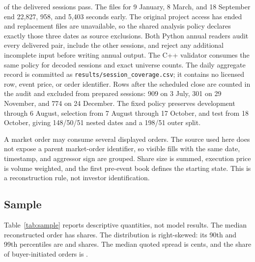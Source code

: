 \documentclass[11pt,a4paper]{article}
\begin{document}
\Sessions{} of the \DeliveredSessions{} delivered sessions pass. The files for
9 January, 8 March, and 18 September end 22,827, 958, and 5,403 seconds early.
The original project access has ended and replacement files are unavailable,
so the shared analysis policy declares exactly those three dates as source
exclusions. Both Python annual readers audit every delivered pair, include the
other \Sessions{} sessions, and reject any additional incomplete input before
writing annual output. The C++ validator consumes the same policy for decoded
sessions and exact universe counts. The daily aggregate record is committed as
\texttt{results/session\_coverage.csv}; it contains no licensed row, event
price, or order identifier. Rows after the scheduled close are counted in the
audit and excluded from prepared sessions: 909 on 3 July, 301 on 29 November,
and 774 on 24 December. The fixed policy preserves development through
6 August, selection from 7 August through 17 October, and test from 18 October,
giving 148/50/51 nested dates and a 198/51 outer split.

A market order may consume several displayed orders. The source used here does
not expose a parent market-order identifier, so visible fills with the same
date, timestamp, and aggressor sign are grouped. Share size is summed, execution
price is volume weighted, and the first pre-event book defines the starting
state. This is a reconstruction rule, not investor identification.

\subsection{Sample}

Table~\ref{tab:sample} reports descriptive quantities, not model results. The
median reconstructed order has \MedianOrderSize{} shares. The distribution is
right-skewed: its 90th and 99th percentiles are \PninetyOrderSize{} and
\PninetynineOrderSize{} shares. The median quoted spread is \MedianSpread{}
cents, and the share of buyer-initiated orders is \BuyerFraction{}.
\end{document}
